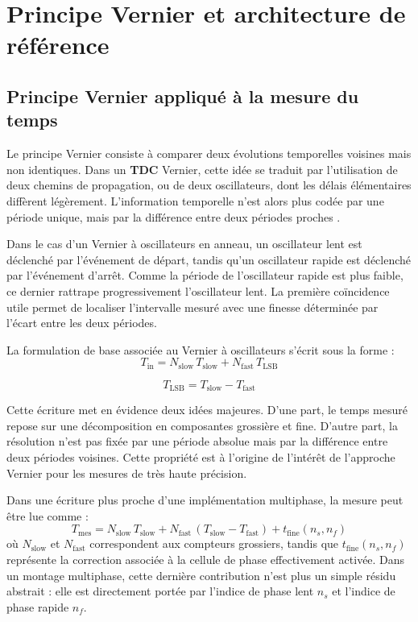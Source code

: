 \chapter{Principe Vernier et architecture de référence}
\label{chap:vernier-reference}
\justifying
\sloppy

\section{Principe Vernier appliqué à la mesure du temps}

Le principe Vernier consiste à comparer deux évolutions temporelles voisines mais non identiques. Dans un \textbf{TDC} Vernier, cette idée se traduit par l'utilisation de deux chemins de propagation, ou de deux oscillateurs, dont les délais élémentaires diffèrent légèrement. L'information temporelle n'est alors plus codée par une période unique, mais par la différence entre deux périodes proches \cite{annagrebah2021thesis,henzler2010tdc,dudek2000vernier}.

Dans le cas d'un Vernier à oscillateurs en anneau, un oscillateur lent est déclenché par l'événement de départ, tandis qu'un oscillateur rapide est déclenché par l'événement d'arrêt. Comme la période de l'oscillateur rapide est plus faible, ce dernier rattrape progressivement l'oscillateur lent. La première coïncidence utile permet de localiser l'intervalle mesuré avec une finesse déterminée par l'écart entre les deux périodes.

La formulation de base associée au Vernier à oscillateurs s'écrit sous la forme \cite{annagrebah2021thesis} :
\begin{equation}
    T_{\mathrm{in}} = N_{\mathrm{slow}}\,T_{\mathrm{slow}} + N_{\mathrm{fast}}\,T_{\mathrm{LSB}}
\end{equation}

\begin{equation}
    T_{\mathrm{LSB}} = T_{\mathrm{slow}} - T_{\mathrm{fast}}
\end{equation}

Cette écriture met en évidence deux idées majeures. D'une part, le temps mesuré repose sur une décomposition en composantes grossière et fine. D'autre part, la résolution n'est pas fixée par une période absolue mais par la différence entre deux périodes voisines. Cette propriété est à l'origine de l'intérêt de l'approche Vernier pour les mesures de très haute précision.

Dans une écriture plus proche d'une implémentation multiphase, la mesure peut être lue comme :
\begin{equation}
    T_{\mathrm{mes}} = N_{\mathrm{slow}}\,T_{\mathrm{slow}} + N_{\mathrm{fast}}\,(T_{\mathrm{slow}}-T_{\mathrm{fast}}) + t_{\mathrm{fine}}(n_s,n_f)
\end{equation}
où $N_{\mathrm{slow}}$ et $N_{\mathrm{fast}}$ correspondent aux compteurs grossiers, tandis que $t_{\mathrm{fine}}(n_s,n_f)$ représente la correction associée à la cellule de phase effectivement activée. Dans un montage multiphase, cette dernière contribution n'est plus un simple résidu abstrait : elle est directement portée par l'indice de phase lent $n_s$ et l'indice de phase rapide $n_f$.

